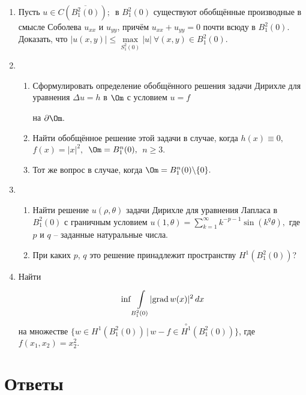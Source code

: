 \documentclass[a4paper]{article}
\def\D{\Delta}
\def\i#1#2{\int\limits_{#1}^{#2}}
\def\s#1#2{\sum\limits_{#1}^{#2}}
\begin{document}
\begin{enumerate}
\item
Пусть $u\in C\left(\overline{B_1^2(0)}\right);$\ в $B_1^2(0)$ существуют
обобщённые производные в смысле Соболева $u_{xx}$ и $u_{yy}$, причём
$u_{xx}+u_{yy}= 0$ почти всюду в $B_1^2(0).$ Доказать, что
$|u(x,y)|\le \max\limits_{S_1^2(0)}|u|\ \forall (x,y)\in B_1^2(0).$

\item
\begin{enumerate}
  \item
  Сформулировать определение обобщённого решения задачи Дирихле для
  уравнения $\D u=h$ в $\Om$ с условием $u=f$

  \noindent
  на $\partial \Om.$
  \item
  Найти обобщённое решение этой задачи в случае, когда $h(x)\equiv0,$\
  $f(x) = |x|^2,$\ $\Om=B_1^n(0),$\ $n\ge 3.$
  \item
  Тот же вопрос в случае, когда $\Om=B_1^n(0)\backslash\{0\}.$
\end{enumerate}

\item
\begin{enumerate}
  \item
  Найти решение $u(\rho,\theta)$ задачи Дирихле для уравнения Лапласа в
  $B_1^2(0)$ с граничным условием $u(1, \theta) = \s{k =1}{\infty} k^{-p-1}
  \sin (k^q\theta),$ где $p$ и $q$ -- заданные натуральные числа.
  \item
  При каких $p$, $q$ это решение принадлежит пространству $H^1(B_1^2(0))$?
\end{enumerate}

\item
Найти $$\inf \displaystyle{\i{B_1^2(0)}{}}| \hbox{grad}\, w(x)|^2\,dx$$
на множестве $\bigg\{w\in H^1(B_1^2(0))\,\Big|
\,w-f\in\stackrel{\circ}{H^1}(B_1^2(0))\bigg\}$, где $f(x_1, x_2) = x_2^2.$

\end{enumerate}

\newpage

\section*{Ответы}
\end{document}
